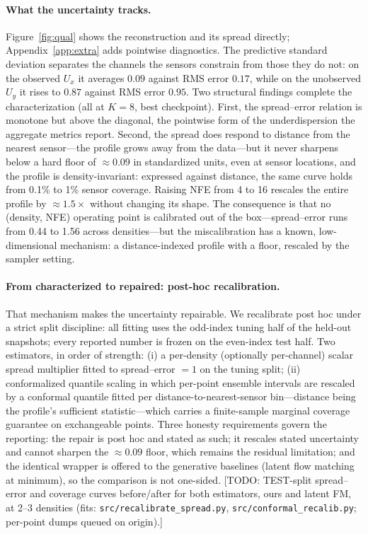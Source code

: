 \documentclass{article} %
\newcommand{\todo}[1]{{\color{red}[TODO: #1]}}
\begin{document}
\paragraph{What the uncertainty tracks.} Figure~\ref{fig:qual} shows the reconstruction and its spread directly; Appendix~\ref{app:extra} adds pointwise diagnostics. The predictive standard deviation separates the channels the sensors constrain from those they do not: on the observed $U_x$ it averages $0.09$ against RMS error $0.17$, while on the unobserved $U_y$ it rises to $0.87$ against RMS error $0.95$. Two structural findings complete the characterization (all at $K{=}8$, best checkpoint). First, the spread--error relation is monotone but above the diagonal, the pointwise form of the underdispersion the aggregate metrics report. Second, the spread does respond to distance from the nearest sensor---the profile grows away from the data---but it never sharpens below a hard floor of ${\approx}0.09$ in standardized units, even at sensor locations, and the profile is density-invariant: expressed against distance, the same curve holds from 0.1\% to 1\% sensor coverage. Raising NFE from 4 to 16 rescales the entire profile by ${\approx}1.5\times$ without changing its shape. The consequence is that no (density, NFE) operating point is calibrated out of the box---spread--error runs from 0.44 to 1.56 across densities---but the miscalibration has a known, low-dimensional mechanism: a distance-indexed profile with a floor, rescaled by the sampler setting.

\paragraph{From characterized to repaired: post-hoc recalibration.}
\label{sec:results-recalib}
That mechanism makes the uncertainty repairable. We recalibrate post hoc under a strict split discipline: all fitting uses the odd-index tuning half of the held-out snapshots; every reported number is frozen on the even-index test half. Two estimators, in order of strength: (i) a per-density (optionally per-channel) scalar spread multiplier fitted to spread--error $=1$ on the tuning split; (ii) conformalized quantile scaling in which per-point ensemble intervals are rescaled by a conformal quantile fitted per distance-to-nearest-sensor bin---distance being the profile's sufficient statistic---which carries a finite-sample marginal coverage guarantee on exchangeable points. Three honesty requirements govern the reporting: the repair is post hoc and stated as such; it rescales stated uncertainty and cannot sharpen the ${\approx}0.09$ floor, which remains the residual limitation; and the identical wrapper is offered to the generative baselines (latent flow matching at minimum), so the comparison is not one-sided. \todo{TEST-split spread--error and coverage curves before/after for both estimators, ours and latent FM, at 2--3 densities (fits: \texttt{src/recalibrate\_spread.py}, \texttt{src/conformal\_recalib.py}; per-point dumps queued on origin).}
\end{document}
